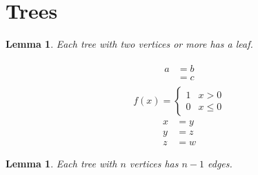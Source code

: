 \documentclass{amsart}
\numberwithin{equation}{section}
\newtheorem{lem}[equation]{Lemma}
\begin{document}
\section{Trees}
\begin{lem} Each tree with two vertices or more has a leaf. \end{lem}
\begin{align}
\begin{split}
 a &= b \\
   &= c
\end{split}
\end{align}
\begin{align}
 f(x) = \begin{cases} 1 & x > 0 \\ 0 & x \le 0 \end{cases}
\end{align}
\begin{align}
 x &= y \\
 y &= z \nonumber \\
 z &= w
\end{align}
\begin{lem} Each tree with $n$ vertices has $n-1$ edges. \end{lem}
\end{document}
